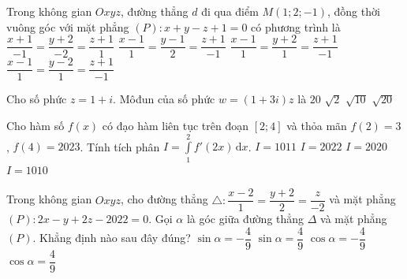 \begin{ex}%
Trong không gian $Oxyz$, đường thẳng $d$ đi qua điểm $M(1;2;-1)$, đồng thời vuông góc với mặt phẳng $(P)\colon x+y-z+1=0$ có phương trình là
\choice
{$\dfrac{x+1}{-1}=\dfrac{y+2}{-2}=\dfrac{z+1}{1}$}
{$\dfrac{x-1}{1}=\dfrac{y-1}{2}=\dfrac{z+1}{-1}$}
{$\dfrac{x-1}{1}=\dfrac{y+2}{1}=\dfrac{z+1}{-1}$}
{\True $\dfrac{x-1}{1}=\dfrac{y-2}{1}=\dfrac{z+1}{-1}$}
\end{ex}


\begin{ex}%
Cho số phức $z=1+i$. Môđun của số phức $w=(1+3i)z$ là
\choice
{$ 20 $}
{$\sqrt{2}$}
{$\sqrt{10}$}
{\True $\sqrt{20}$}
\end{ex}


\begin{ex}%
Cho hàm số $f(x)$ có đạo hàm liên tục trên đoạn $[2;4]$ và thỏa mãn $f(2)=3$, $f(4)=2023$. Tính tích phân $I=\displaystyle\int\limits_1^2{f'(2x)\mathrm{\,d}x}$.
\choice
{$I=1011$}
{$I=2022$}
{$I=2020$}
{\True $I=1010$}
\end{ex}


\begin{ex}%
Trong không gian $Oxyz$, cho đường thẳng $\triangle \colon \dfrac{x-2}{1}=\dfrac{y+2}{2}=\dfrac{z}{-2}$ và mặt phẳng $(P)\colon 2x-y+2z-2022=0$. Gọi $\alpha $ là góc giữa đường thẳng $\Delta $ và mặt phẳng $(P)$. Khẳng định nào sau đây đúng?
\choice
{$\sin \alpha =-\dfrac{4}{9}$}
{\True $\sin \alpha =\dfrac{4}{9}$}
{$\cos \alpha =-\dfrac{4}{9}$}
{$\cos \alpha =\dfrac{4}{9}$}
\end{ex}


